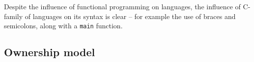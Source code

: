 Despite the influence of functional programming on languages, the influence of C-family of languages on its syntax is clear -- for example the use of braces and semicolons, along with a \texttt{main} function.









\subsection{Ownership model}
\label{ssec:rust-ownership}

